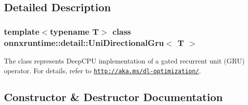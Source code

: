 \subsection{Detailed Description}
\subsubsection*{template$<$typename T$>$\newline
class onnxruntime\+::detail\+::\+Uni\+Directional\+Gru$<$ T $>$}

The class represents Deep\+C\+PU implementation of a gated recurrent unit (G\+RU) operator. For details, refer to \href{http://aka.ms/dl-optimization/}{\tt http\+://aka.\+ms/dl-\/optimization/}. 

\subsection{Constructor \& Destructor Documentation}
\mbox{\label{classonnxruntime_1_1detail_1_1UniDirectionalGru_ac4d703da2103821622f78989354f4114}} 
